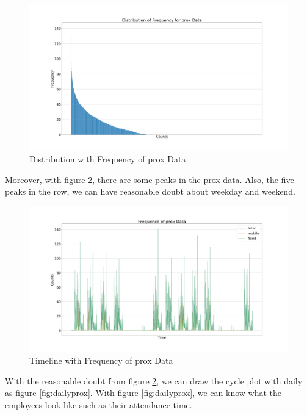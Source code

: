 \documentclass[aps, 10pt, a4paper]{article}
\begin{document}
                \begin{figure}[htbp]
                    \centering
                    \includegraphics[width=0.4 \linewidth]{figures/freq.png}
                    \caption{Distribution with Frequency of prox Data}
                    \label{fig:freq}
                \end{figure}
            
                Moreover, with figure \ref{fig:timeline}, there are some peaks in the prox data. Also, the five peaks in the row, we can have reasonable doubt about weekday and weekend. 
                
                \begin{figure}[htbp]
                    \centering
                    \includegraphics[width=0.4 \linewidth]{figures/daily.png}
                    \caption{Timeline with Frequency of prox Data}
                    \label{fig:timeline}
                \end{figure}
            
                With the reasonable doubt from figure \ref{fig:timeline}, we can draw the cycle plot with daily as figure \ref{fig:dailyprox}. With figure \ref{fig:dailyprox}, we can know what the employees look like such as their attendance time. 
                
\end{document}
